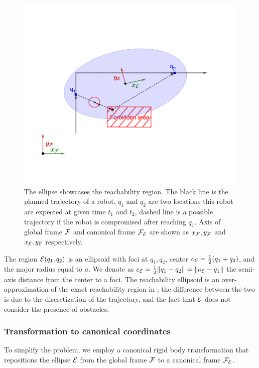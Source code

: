 \documentclass[journal]{IEEEtran}  %
\begin{document}
 \begin{figure}
    \centering
    \includegraphics[width=0.8\linewidth, trim = 2cm 2.5cm 2cm 5cm]{Reachability}
    \caption{The ellipse showcases the reachability region. The black line is the planned trajectory of a robot, $q_1$ and $q_2$ are two locations this robot are expected at given time $t_1$ and $t_2$, dashed line is a possible trajectory if the robot is compromised after reaching $q_1$. Axis of global frame $\mathcal{F}$ and canonical frame $\mathcal{F}_{\mathcal{E}}$ are shown as $x_{\mathcal{F}}, y_{\mathcal{F}}$ and $x_{\mathcal{E}}, y_{\mathcal{E}}$ respectively. }
    \label{fig:EllipseConstraintExample}
  \end{figure}
 

The region $\mathcal{E}(q_1,q_2)$ is an ellipsoid with foci at $q_1,q_2$, center $o_{\mathcal{E}} = \frac{1}{2}(q_1+q_2)$, and the major radius equal to $a$. We denote as $c_{\mathcal{E}}=\frac{1}{2}\lVert q_1-q_2\rVert=\lVert o_{\mathcal{E}}-q_1\rVert$ the semi-axis distance from the center to a foci.
The reachability ellipsoid is an over-approximation of the exact reachability region in ; the difference between the two is due to the discretization of the trajectory, and the fact that $\mathcal{E}$ does not consider the presence of obstacles.

\subsubsection{Transformation to canonical coordinates}\label{sec:rotation2Standard}
To simplify the problem, we employ a canonical rigid body transformation that repositions the ellipse $\mathcal{E}$ from the global frame $\mathcal{F}$ to a canonical frame $\mathcal{F}_{\mathcal{E}}$. 
\end{document}
